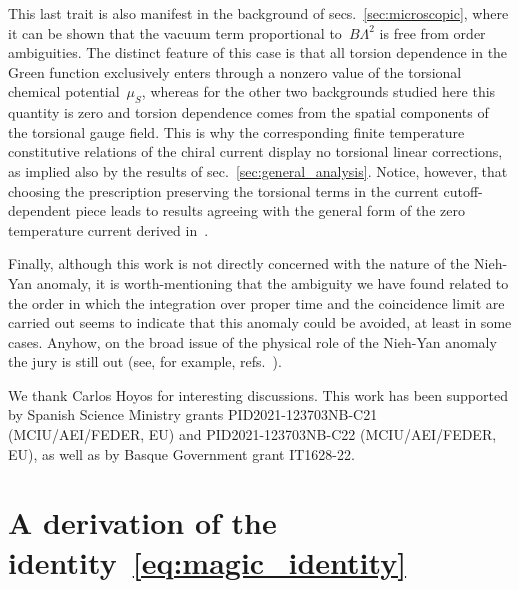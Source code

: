 \documentclass[11pt,a4paper]{article}
\begin{document}
This last
trait is also manifest in the background of secs.~\ref{sec:microscopic}, where it can 
be shown that the vacuum term 
proportional to~$B\Lambda^{2}$ is free from order ambiguities. The distinct 
feature of this case is that all torsion dependence in the 
Green function exclusively enters through a nonzero value of
the torsional chemical potential~$\mu_{S}$, whereas for the other two 
backgrounds studied here this quantity is zero and torsion dependence comes from the spatial components 
of the torsional gauge field. 
This is why the corresponding finite temperature
constitutive relations of the chiral current display no torsional linear corrections, as implied also by the results
of sec.~\ref{sec:general_analysis}. 
Notice, however, that choosing the prescription preserving the torsional terms in the 
current cutoff-dependent piece leads to results agreeing with the general form of the 
zero temperature current derived in~\cite{Valle:2021nfv}.

Finally, although this work  is not  directly concerned with the nature of the Nieh-Yan anomaly, 
it is worth-mentioning that the ambiguity we have found related to the order in which the 
integration over proper time and the coincidence limit are carried out seems to indicate that this anomaly 
could be avoided, at least in some cases.  
Anyhow, on the broad issue of the physical role of the Nieh-Yan anomaly 
the jury is still out (see, for example, 
refs.~\cite{Chandia:1997hu,Soo:1998ev,
Huang:2019haq,Nissinen:2019kld,Nissinen:2019wmh,Nissinen:2019mkw,Huang:2019adx,Huang:2020ypv,
Imaki:2020csc,Liu:2021bic,Nissinen:2021gke,Chernodub:2021nff,Valle:2021nfv,Rasulian:2023gtb}).



\acknowledgments

We thank Carlos Hoyos for interesting discussions.
This work has been supported by 
Spanish Science Ministry grants PID2021-123703NB-C21
(MCIU/AEI/FEDER, EU) and PID2021-123703NB-C22
(MCIU/AEI/FEDER, EU), as well as by Basque Government
grant IT1628-22. 

\appendix
\section{A derivation of the identity~\eqref{eq:magic_identity}}
\label{app:magic_identity}
\end{document}
